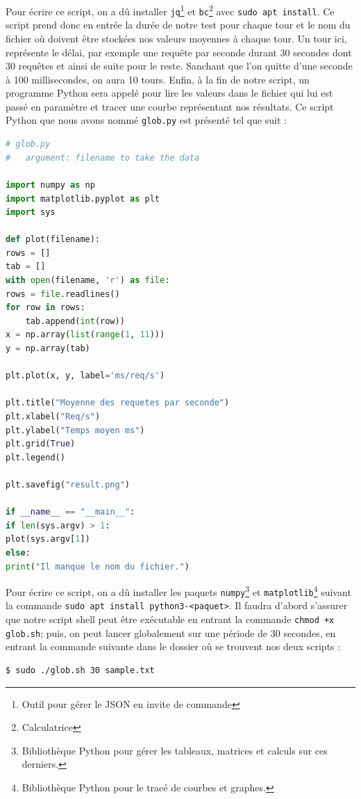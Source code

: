 Pour \'ecrire ce script, on a d\^u installer \lstinline{jq}\footnote{Outil pour g\'erer le JSON en invite de commande} et \lstinline{bc}\footnote{Calculatrice} avec \lstinline{sudo apt install}. 
Ce script prend donc en entr\'ee la dur\'ee de notre test pour chaque tour et le nom du fichier o\`u doivent \^etre stock\'ees nos valeurs moyennes \`a chaque tour. Un tour ici, repr\'esente le d\'elai, 
par exemple une requ\^ete par seconde durant 30 secondes dont 30 requ\^etes et ainsi de suite pour le reste. Sanchant que l'on quitte d'une seconde \`a 100 millisecondes, on aura 10 tours. 
Enfin, \`a la fin de notre script, un programme Python sera appel\'e pour lire les valeurs dans le fichier qui lui est pass\'e en param\`etre et tracer une courbe repr\'esentant nos r\'esultats. 
Ce script Python que nous avons nomm\'e \lstinline{glob.py} est pr\'esent\'e tel que suit :
\begin{lstlisting}[language=python, frame=single, title={glob.py}, breaklines]
# glob.py 
#   argument: filename to take the data

import numpy as np 
import matplotlib.pyplot as plt 
import sys

def plot(filename):
rows = []
tab = []
with open(filename, 'r') as file:
rows = file.readlines()
for row in rows:
    tab.append(int(row))
x = np.array(list(range(1, 11)))
y = np.array(tab)

plt.plot(x, y, label='ms/req/s')

plt.title("Moyenne des requetes par seconde")
plt.xlabel("Req/s")
plt.ylabel("Temps moyen ms")
plt.grid(True)
plt.legend()

plt.savefig("result.png")

if __name__ == "__main__":
if len(sys.argv) > 1:
plot(sys.argv[1])
else:
print("Il manque le nom du fichier.")
\end{lstlisting}

Pour \'ecrire ce script, on a d\^u installer les paquets \lstinline{numpy}\footnote{Biblioth\`eque Python pour g\'erer les tableaux, matrices et calculs sur ces derniers.} et 
\lstinline{matplotlib}\footnote{Biblioth\`eque Python pour le trac\'e de courbes et graphes.} suivant la commande \lstinline{sudo apt install python3-<paquet>}. 
Il faudra d'abord s'assurer que notre script shell peut \^etre ex\'ecutable en entrant la commande \lstinline{chmod +x glob.sh}; puis, on peut lancer globalement 
sur une p\'eriode de 30 secondes, en entrant la commande suivante dans le dossier o\`u se trouvent nos deux scripts :
\begin{lstlisting}[language=bash, frame=single, title={Ex\'ecution de glob.sh}, breaklines]
$ sudo ./glob.sh 30 sample.txt
\end{lstlisting}

